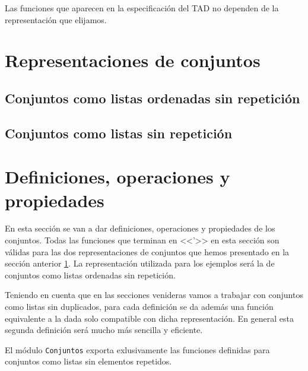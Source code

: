 \begin{nota}
  Las funciones que aparecen en la especificación del TAD no dependen 
  de la representación que elijamos.
\end{nota}

\section{Representaciones de conjuntos}

\label{sec:rep_conjuntos}

\subsection{Conjuntos como listas ordenadas sin repetición}


\subsection{Conjuntos como listas sin repetición}


\section{Definiciones, operaciones y propiedades}

En esta sección se van a dar definiciones, operaciones y propiedades
de los conjuntos. Todas las funciones que terminan en <<'>> en esta 
sección son válidas para las dos representaciones de conjuntos que     
hemos presentado en la sección anterior \ref{sec:rep_conjuntos}.
La representación utilizada para los ejemplos será la de conjuntos
como listas ordenadas sin repetición.

Teniendo en cuenta que en las secciones venideras vamos a trabajar con         
conjuntos como listas sin duplicados, para cada definición se da además
una función equivalente a la dada solo compatible con dicha representación.
En general esta segunda definición será mucho más sencilla y eficiente.

\begin{nota}
El módulo \texttt{Conjuntos} exporta exlusivamente las funciones definidas   
para conjuntos como listas sin elementos repetidos. 
\end{nota}

